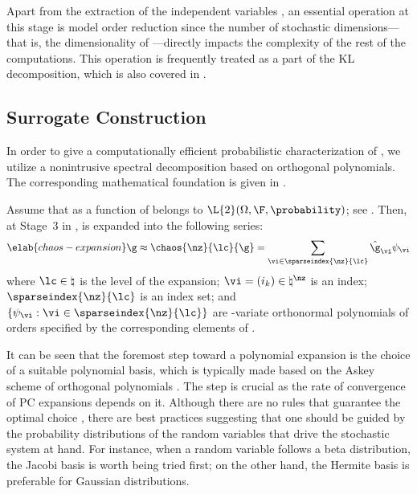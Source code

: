 Apart from the extraction of the independent variables \vz, an essential
operation at this stage is model order reduction since the number of stochastic
dimensions---that is, the dimensionality of \vz---directly impacts the
complexity of the rest of the computations. This operation is frequently treated
as a part of the \ac{KL} decomposition, which is also covered in
.

\subsection{Surrogate Construction}

In order to give a computationally efficient probabilistic characterization of
\g, we utilize a nonintrusive spectral decomposition based on orthogonal
polynomials. The corresponding mathematical foundation is given in
.

Assume that \g as a function of \vu belongs to $\L{2}(\Omega, \F,
\probability)$; see . Then, at Stage~3 in
, \g is expanded into the following series:
\begin{equation} \elab{chaos-expansion}
  \g \approx \chaos{\nz}{\lc}{\g} = \sum_{\vi \in \sparseindex{\nz}{\lc}} \hat{\g}_{\vi} \psi_{\vi}
\end{equation}
where $\lc \in \natural$ is the level of the expansion; $\vi = (i_k) \in
\natural^\nz$ is an index; $\sparseindex{\nz}{\lc}$ is an index set; and $\{
\psi_{\vi}: \vi \in \sparseindex{\nz}{\lc} \}$ are \nz-variate orthonormal
polynomials of orders specified by the corresponding elements of \vi.

It can be seen that the foremost step toward a polynomial expansion is the
choice of a suitable polynomial basis, which is typically made based on the
Askey scheme of orthogonal polynomials \cite{xiu2010}. The step is crucial as
the rate of convergence of \ac{PC} expansions depends on it. Although there are
no rules that guarantee the optimal choice \cite{knio2006}, there are best
practices suggesting that one should be guided by the probability distributions
of the random variables that drive the stochastic system at hand. For instance,
when a random variable follows a beta distribution, the Jacobi basis is worth
being tried first; on the other hand, the Hermite basis is preferable for
Gaussian distributions.

